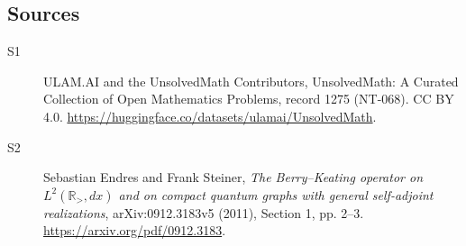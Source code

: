 \documentclass[11pt]{article}
\begin{document}
\subsection{Sources}
\begin{description}
\item[\hypertarget{source:1275:1}{S1}] ULAM.AI and the UnsolvedMath Contributors, UnsolvedMath: A Curated Collection of Open Mathematics Problems, record 1275 (NT-068). CC BY 4.0. \url{https://huggingface.co/datasets/ulamai/UnsolvedMath}.
\item[\hypertarget{source:1275:2}{S2}] Sebastian Endres and Frank Steiner, \emph{The Berry--Keating operator on $L^2(\mathbb R_{>},dx)$ and on compact quantum graphs with general self-adjoint realizations}, arXiv:0912.3183v5 (2011), Section 1, pp. 2--3. \url{https://arxiv.org/pdf/0912.3183}.
\end{description}
\label{end:1275}
\end{document}
